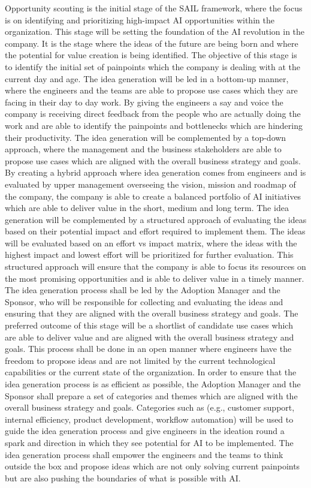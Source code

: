 \documentclass[]{imc-inf}
\begin{document}
Opportunity scouting is the initial stage of the SAIL framework, where
the focus is on identifying and prioritizing high-impact AI
opportunities within the organization. This stage will be setting the
foundation of the AI revolution in the company. It is the stage where
the ideas of the future are being born and where the potential for value
creation is being identified. The objective of this stage is to identify
the initial set of painpoints which the company is dealing with at the
current day and age. The idea generation will be led in a bottom-up
manner, where the engineers and the teams are able to propose use cases
which they are facing in their day to day work. By giving the engineers
a say and voice the company is receiving direct feedback from the people
who are actually doing the work and are able to identify the painpoints
and bottlenecks which are hindering their productivity. The idea
generation will be complemented by a top-down approach, where the
management and the business stakeholders are able to propose use cases
which are aligned with the overall business strategy and goals. By
creating a hybrid approach where idea generation comes from engineers
and is evaluated by upper management overseeing the vision, mission and
roadmap of the company, the company is able to create a balanced
portfolio of AI initiatives which are able to deliver value in the
short, medium and long term. The idea generation will be complemented by
a structured approach of evaluating the ideas based on their potential
impact and effort required to implement them. The ideas will be
evaluated based on an effort vs impact matrix, where the ideas with the
highest impact and lowest effort will be prioritized for further
evaluation. This structured approach will ensure that the company is
able to focus its resources on the most promising opportunities and is
able to deliver value in a timely manner. The idea generation process
shall be led by the Adoption Manager and the Sponsor, who will be
responsible for collecting and evaluating the ideas and ensuring that
they are aligned with the overall business strategy and goals. The
preferred outcome of this stage will be a shortlist of candidate use
cases which are able to deliver value and are aligned with the overall
business strategy and goals. This process shall be done in an open
manner where engineers have the freedom to propose ideas and are not
limited by the current technological capabilities or the current state
of the organization. In order to ensure that the idea generation process
is as efficient as possible, the Adoption Manager and the Sponsor shall
prepare a set of categories and themes which are aligned with the
overall business strategy and goals. Categories such as (e.g., customer
support, internal efficiency, product development, workflow automation)
will be used to guide the idea generation process and give engineers in
the ideation round a spark and direction in which they see potential for
AI to be implemented. The idea generation process shall empower the
engineers and the teams to think outside the box and propose ideas which
are not only solving current painpoints but are also pushing the
boundaries of what is possible with AI.
\end{document}
